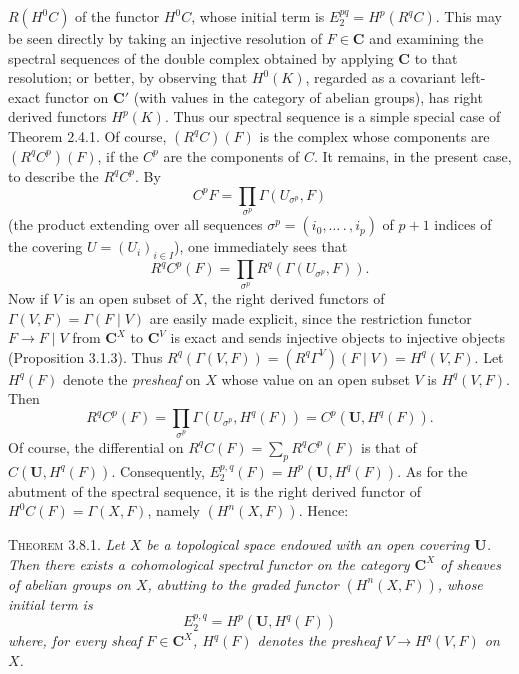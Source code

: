 
\noindent $R(H^0C)$ of the functor $H^0C$, whose initial term is
$E_2^{pq}=H^p(R^qC)$.
This may be seen directly by taking an injective resolution of $F\in\mathbf C$ and
examining the spectral sequences of the double complex obtained by applying
$\mathbf C$ to that resolution; or better, by observing that $H^0(K)$, regarded as a
covariant left-exact functor on $\mathbf C'$ (with values in the category of abelian
groups), has right derived functors $H^p(K)$. Thus our spectral sequence is a
simple special case of Theorem 2.4.1. Of course, $(R^qC)(F)$ is the complex
whose components are $(R^qC^p)(F)$, if the $C^p$ are the components of $C$.
It remains, in the present case, to describe the $R^qC^p$. By
\[
C^pF=\prod_{\sigma^p}\Gamma(U_{\sigma^p},F)
\]
(the product extending over all sequences $\sigma^p=(i_0,\ldots\mathpunct{.},i_p)$ of
$p+1$ indices of the covering $U=(U_i)_{i\in I}$), one immediately
sees that
\[
R^qC^p(F)=\prod_{\sigma^p}R^q(\Gamma(U_{\sigma^p},F)).
\]
Now if $V$ is an open subset of $X$, the right derived functors of
$\Gamma(V,F)=\Gamma(F\mid V)$ are easily made explicit, since the restriction
functor $F\to F\mid V$ from $\mathbf C^X$ to $\mathbf C^V$ is exact and sends
injective objects to injective objects (Proposition 3.1.3). Thus
$R^q(\Gamma(V,F))=(R^q\Gamma^V)(F\mid V)=H^q(V,F)$.
Let $H^q(F)$ denote the \textit{presheaf} on $X$ whose value on an open subset
$V$ is $H^q(V,F)$. Then
\[
R^qC^p(F)=\prod_{\sigma^p}\Gamma(U_{\sigma^p},H^q(F))
=C^p(\mathbf U,H^q(F)).
\]
Of course, the differential on $R^qC(F)=\displaystyle\sum\limits_p R^qC^p(F)$ is that of
$C(\mathbf U,H^q(F))$. Consequently,
$E_2^{p,q}(F)=H^p(\mathbf U,H^q(F))$.
As for the abutment of the spectral sequence, it is the right derived functor
of $H^0C(F)=\Gamma(X,F)$, namely $(H^n(X,F))$. Hence:

\textsc{Theorem 3.8.1.} \textit{Let $X$ be a topological space
endowed with an open covering $\mathbf U$. Then there exists a cohomological
spectral functor on the category $\mathbf C^X$ of sheaves of abelian groups on $X$,
abutting to the graded functor $(H^n(X,F))$, whose initial term is}
\[
E_2^{p,q}=H^p(\mathbf U,H^q(F))
\]
\textit{where, for every sheaf $F\in\mathbf C^X$, $H^q(F)$ denotes the presheaf
$V\to H^q(V,F)$ on $X$.}

